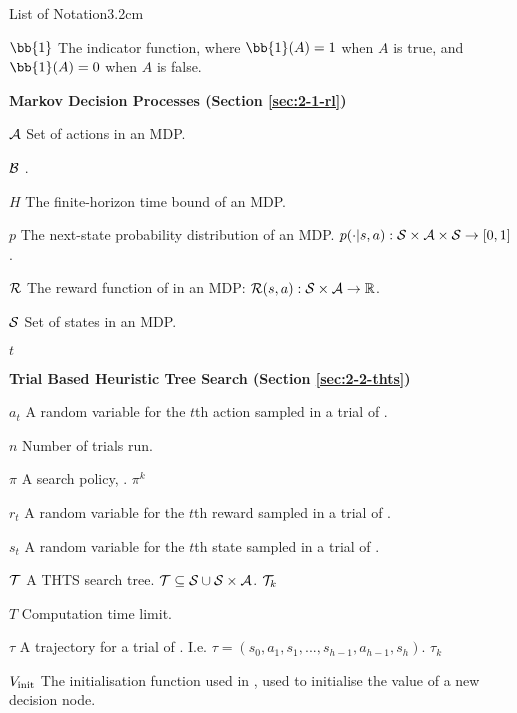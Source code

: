 \begin{mclistof}{List of Notation}{3.2cm}


    \item[$\bb{1}$] The indicator function, where $\bb{1}(A)=1$ when $A$ is true, and $\bb{1}(A)=0$ when $A$ is false.
    \\
    \item[\Large\textbf{Markov Decision Processes (Section \ref{sec:2-1-rl})}\hfill\hfill]
    \item[$\mathcal{A}$] 
        Set of actions in an MDP.
    \item[$\mathcal{B}$]
        .
    \item[$H$] 
        The finite-horizon time bound of an MDP. 
    \item[$p$] 
        The next-state probability distribution of an MDP.  $p(\cdot | s,a) : \mathcal{S} \times \mathcal{A} \times \mathcal{S} \rightarrow [0,1]$.
    \item[$\mathcal{R}$] 
        The reward function of in an MDP: $\mathcal{R}(s,a) : \mathcal{S}\times \mathcal{A}\rightarrow \mathbb{R}$.
    \item[$\mathcal{S}$] 
        Set of states in an MDP. 
    \item[$t$] 
    \\
    \item[\Large\textbf{Trial Based Heuristic Tree Search (Section \ref{sec:2-2-thts})}\hfill\hfill]
    \item[$a_t$] 
        A random variable for the $t$th action sampled in a trial of \thtspp.
    \item[$n$] 
        Number of trials run.
    \item[$\pi$]
        A search policy, .  $\pi^k$
    \item[$r_t$] 
        A random variable for the $t$th reward sampled in a trial of \thtspp.
    \item[$s_t$] 
        A random variable for the $t$th state sampled in a trial of \thtspp.
    \item[$\mathcal{T}$] 
        A THTS search tree.  $\mathcal{T}\subseteq \mathcal{S} \cup \mathcal{S}\times\mathcal{A}$.  $\mathcal{T}_k$
    \item[$T$] 
        Computation time limit.
    \item[$\tau$] 
        A trajectory for a trial of \thtspp. I.e. $\tau=(s_0,a_1,s_1,...,s_{h-1},a_{h-1},s_h)$.  $\tau_k$
    \item[$V_{\text{init}}$]
        The initialisation function used in \thtspp, used to initialise the value of a new decision node.

\end{mclistof} 


